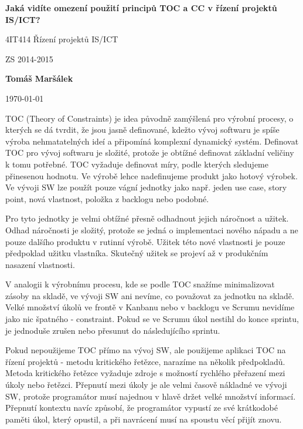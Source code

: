 \documentclass[10pt]{article}
\begin{document}
\thispagestyle{empty}
\begin{center}
    \Large
    \textbf{Jaká vidíte omezení použití principů TOC a CC v řízení projektů IS/ICT?}

    \vspace{.1cm}
    4IT414 Řízení projektů IS/ICT

    ZS 2014-2015

    \vspace{.6cm}
    \large
    \textbf{Tomáš Maršálek}

    \today

    \vspace{1cm}
\end{center}

TOC (Theory of Constraints) je idea původně zamýšlená pro výrobní procesy, o
kterých se dá tvrdit, že jsou jasně definované, kdežto vývoj softwaru je spíše
výroba nehmatatelných ideí a připomíná komplexní dynamický systém.  Definovat
TOC pro vývoj softwaru je složité, protože je obtížné definovat základní
veličiny k tomu potřebné.  TOC vyžaduje definovat míry, podle kterých sledujeme
přinesenou hodnotu. Ve výrobě lehce nadefinujeme produkt jako hotový výrobek.
Ve vývoji SW lze použít pouze vágní jednotky jako např. jeden use case, story
point, nová vlastnost, položka z backlogu nebo podobné.

Pro tyto jednotky je velmi obtížné přesně odhadnout jejich náročnost a užitek.
Odhad náročnosti je složitý, protože se jedná o implementaci nového nápadu a ne
pouze dalšího produktu v rutinní výrobě. Užitek této nové vlastnosti je pouze
předpoklad užitku vlastníka. Skutečný užitek se projeví až v produkčním
nasazení vlastnosti. 

V analogii k výrobnímu procesu, kde se podle TOC snažíme minimalizovat zásoby
na skladě, ve vývoji SW ani nevíme, co považovat za jednotku na skladě. Velké
množství úkolů ve frontě v Kanbanu nebo v backlogu ve Scrumu nevidíme jako nic
špatného - constraint. Pokud se ve Scrumu úkol nestihl do konce sprintu, je
jednoduše zrušen nebo přesunut do následujícího sprintu.

Pokud nepoužijeme TOC přímo na vývoj SW, ale použijeme aplikaci TOC na řízení
projektů - metodu kritického řetězce, narazíme na několik předpokladů. Metoda
kritického řetězce vyžaduje zdroje s možností rychlého přeřazení mezi úkoly
nebo řetězci. Přepnutí mezi úkoly je ale velmi časově nákladné ve vývoji SW,
protože programátor musí najednou v hlavě držet velké množství informací.
Přepnutí kontextu navíc způsobí, že programátor vypustí ze své krátkodobé
paměti úkol, který opustil, a při navrácení musí na spoustu věcí přijít znovu.
\end{document}
